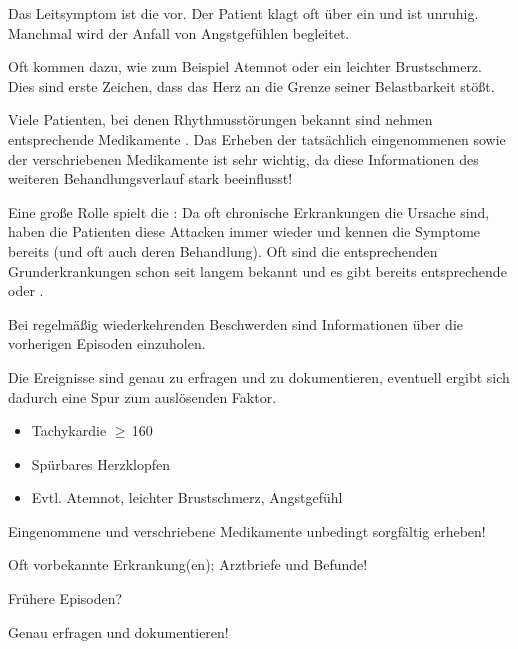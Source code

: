 \TextSlide
{{\TxSAMPLER}}
{
\begin{SAMPLERText}
  \item[\SAMPLER{S}] Das Leitsymptom ist die  vor. 
  Der Patient
  klagt oft über ein  und ist unruhig. Manchmal wird der Anfall von
  Angstgefühlen begleitet.
  
  Oft kommen  dazu, wie zum Beispiel Atemnot oder ein
  leichter Brustschmerz. Dies sind erste Zeichen, dass das Herz an
  die Grenze seiner Belastbarkeit stößt.
  \item[\SAMPLER{M}] Viele Patienten, bei denen
  Rhythmusstörungen bekannt sind nehmen entsprechende
  Medikamente . 
  Das Erheben der tatsächlich eingenommenen sowie der verschriebenen Medikamente
  ist sehr wichtig, da diese Informationen des weiteren Behandlungsverlauf
  stark beeinflusst!
  \item[\SAMPLER{P}] Eine große Rolle spielt die : Da oft
  chronische Erkrankungen die Ursache sind, haben die
  Patienten diese Attacken immer wieder und kennen die
  Symptome bereits (und oft auch deren Behandlung). Oft sind die
  entsprechenden Grunderkrankungen schon seit langem bekannt und es 
  gibt bereits entsprechende  oder .
  \item[\SAMPLER{L}] Bei regelmäßig wiederkehrenden Beschwerden sind 
  Informationen über die vorherigen Episoden einzuholen.
  \item[\SAMPLER{E}] Die Ereignisse sind genau zu erfragen und zu
  dokumentieren, eventuell ergibt sich dadurch eine Spur zum auslösenden Faktor.
\end{SAMPLERText}
}
{
\begin{SAMPLERSlide}
  \item[\SAMPLER{S}]
  \begin{itemize}
    \item Tachykardie $\geq$\,160\PerMin*
    \item Spürbares Herzklopfen
    \item Evtl. Atemnot, leichter Brustschmerz, Angstgefühl
  \end{itemize}
  \item[\SAMPLER{M}]  Eingenommene und verschriebene Medikamente unbedingt sorgfältig erheben!
  \item[\SAMPLER{P}] Oft vorbekannte Erkrankung(en); Arztbriefe und Befunde!
  \item[\SAMPLER{L}] Frühere Episoden?
  \item[\SAMPLER{E}] Genau erfragen und dokumentieren!
\end{SAMPLERSlide}
}
{}
{}
{}



